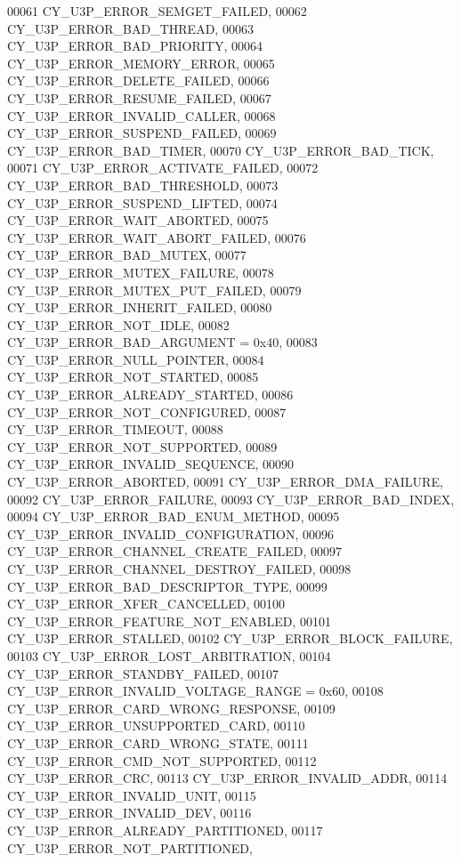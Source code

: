 \begin{DoxyCode}
00061     CY_U3P_ERROR_SEMGET_FAILED,         
00062     CY_U3P_ERROR_BAD_THREAD,            
00063     CY_U3P_ERROR_BAD_PRIORITY,          
00064     CY_U3P_ERROR_MEMORY_ERROR,          
00065     CY_U3P_ERROR_DELETE_FAILED,         
00066     CY_U3P_ERROR_RESUME_FAILED,         
00067     CY_U3P_ERROR_INVALID_CALLER,        
00068     CY_U3P_ERROR_SUSPEND_FAILED,        
00069     CY_U3P_ERROR_BAD_TIMER,             
00070     CY_U3P_ERROR_BAD_TICK,              
00071     CY_U3P_ERROR_ACTIVATE_FAILED,       
00072     CY_U3P_ERROR_BAD_THRESHOLD,         
00073     CY_U3P_ERROR_SUSPEND_LIFTED,        
00074     CY_U3P_ERROR_WAIT_ABORTED,          
00075     CY_U3P_ERROR_WAIT_ABORT_FAILED,     
00076     CY_U3P_ERROR_BAD_MUTEX,             
00077     CY_U3P_ERROR_MUTEX_FAILURE,         
00078     CY_U3P_ERROR_MUTEX_PUT_FAILED,      
00079     CY_U3P_ERROR_INHERIT_FAILED,        
00080     CY_U3P_ERROR_NOT_IDLE,              
00082     CY_U3P_ERROR_BAD_ARGUMENT = 0x40,   
00083     CY_U3P_ERROR_NULL_POINTER,          
00084     CY_U3P_ERROR_NOT_STARTED,           
00085     CY_U3P_ERROR_ALREADY_STARTED,       
00086     CY_U3P_ERROR_NOT_CONFIGURED,        
00087     CY_U3P_ERROR_TIMEOUT,               
00088     CY_U3P_ERROR_NOT_SUPPORTED,         
00089     CY_U3P_ERROR_INVALID_SEQUENCE,      
00090     CY_U3P_ERROR_ABORTED,               
00091     CY_U3P_ERROR_DMA_FAILURE,           
00092     CY_U3P_ERROR_FAILURE,               
00093     CY_U3P_ERROR_BAD_INDEX,             
00094     CY_U3P_ERROR_BAD_ENUM_METHOD,       
00095     CY_U3P_ERROR_INVALID_CONFIGURATION, 
00096     CY_U3P_ERROR_CHANNEL_CREATE_FAILED, 
00097     CY_U3P_ERROR_CHANNEL_DESTROY_FAILED,
00098     CY_U3P_ERROR_BAD_DESCRIPTOR_TYPE,   
00099     CY_U3P_ERROR_XFER_CANCELLED,        
00100     CY_U3P_ERROR_FEATURE_NOT_ENABLED,   
00101     CY_U3P_ERROR_STALLED,               
00102     CY_U3P_ERROR_BLOCK_FAILURE,         
00103     CY_U3P_ERROR_LOST_ARBITRATION,      
00104     CY_U3P_ERROR_STANDBY_FAILED,        
00107     CY_U3P_ERROR_INVALID_VOLTAGE_RANGE = 0x60,  
00108     CY_U3P_ERROR_CARD_WRONG_RESPONSE,           
00109     CY_U3P_ERROR_UNSUPPORTED_CARD,              
00110     CY_U3P_ERROR_CARD_WRONG_STATE,              
00111     CY_U3P_ERROR_CMD_NOT_SUPPORTED,             
00112     CY_U3P_ERROR_CRC,                           
00113     CY_U3P_ERROR_INVALID_ADDR,                  
00114     CY_U3P_ERROR_INVALID_UNIT,                  
00115     CY_U3P_ERROR_INVALID_DEV,                   
00116     CY_U3P_ERROR_ALREADY_PARTITIONED,           
00117     CY_U3P_ERROR_NOT_PARTITIONED,               

\end{DoxyCode}

